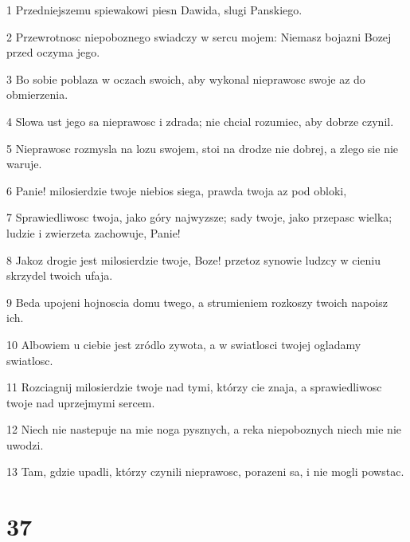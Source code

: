 \par 1 Przedniejszemu spiewakowi piesn Dawida, slugi Panskiego.
\par 2 Przewrotnosc niepoboznego swiadczy w sercu mojem: Niemasz bojazni Bozej przed oczyma jego.
\par 3 Bo sobie poblaza w oczach swoich, aby wykonal nieprawosc swoje az do obmierzenia.
\par 4 Slowa ust jego sa nieprawosc i zdrada; nie chcial rozumiec, aby dobrze czynil.
\par 5 Nieprawosc rozmysla na lozu swojem, stoi na drodze nie dobrej, a zlego sie nie waruje.
\par 6 Panie! milosierdzie twoje niebios siega, prawda twoja az pod obloki,
\par 7 Sprawiedliwosc twoja, jako góry najwyzsze; sady twoje, jako przepasc wielka; ludzie i zwierzeta zachowuje, Panie!
\par 8 Jakoz drogie jest milosierdzie twoje, Boze! przetoz synowie ludzcy w cieniu skrzydel twoich ufaja.
\par 9 Beda upojeni hojnoscia domu twego, a strumieniem rozkoszy twoich napoisz ich.
\par 10 Albowiem u ciebie jest zródlo zywota, a w swiatlosci twojej ogladamy swiatlosc.
\par 11 Rozciagnij milosierdzie twoje nad tymi, którzy cie znaja, a sprawiedliwosc twoje nad uprzejmymi sercem.
\par 12 Niech nie nastepuje na mie noga pysznych, a reka niepoboznych niech mie nie uwodzi.
\par 13 Tam, gdzie upadli, którzy czynili nieprawosc, porazeni sa, i nie mogli powstac.

\chapter{37}


